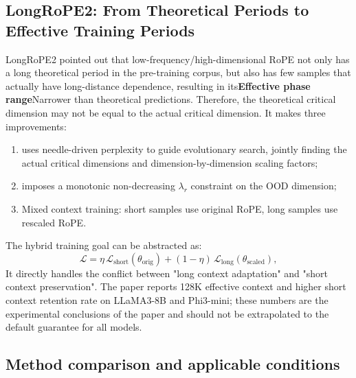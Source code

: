 \documentclass[UTF8,fontset=none,a4paper,10pt]{ctexart}
\newcommand{\term}[1]{\textbf{#1}}
\begin{document}
\subsection{LongRoPE2: From Theoretical Periods to Effective Training Periods}

LongRoPE2 pointed out that low-frequency/high-dimensional RoPE not only has a long theoretical period in the pre-training corpus, but also has few samples that actually have long-distance dependence, resulting in its\term{Effective phase range}Narrower than theoretical predictions\cite{en:longrope2}. Therefore, the theoretical critical dimension may not be equal to the actual critical dimension. It makes three improvements:
\begin{enumerate}
\item uses needle-driven perplexity to guide evolutionary search, jointly finding the actual critical dimensions and dimension-by-dimension scaling factors;
\item imposes a monotonic non-decreasing $\lambda_r$ constraint on the OOD dimension;
\item Mixed context training: short samples use original RoPE, long samples use rescaled RoPE.
\end{enumerate}
The hybrid training goal can be abstracted as:
\begin{equation}
  \mathcal{L}=\eta\,\mathcal{L}_{\mathrm{short}}(\theta_{\mathrm{orig}})
  +(1-\eta)\,\mathcal{L}_{\mathrm{long}}(\theta_{\mathrm{scaled}}),
  \label{en:eq:mixed-context-loss}
\end{equation}
It directly handles the conflict between "long context adaptation" and "short context preservation". The paper reports 128K effective context and higher short context retention rate on LLaMA3-8B and Phi3-mini; these numbers are the experimental conclusions of the paper and should not be extrapolated to the default guarantee \cite{en:longrope2} for all models.

\subsection{Method comparison and applicable conditions}
\end{document}
